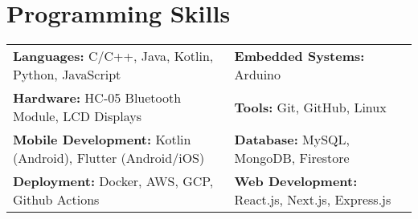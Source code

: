 \documentclass[letterpaper,10pt]{article}
\newcommand{\customFormat}[2]{\textbf{#1:} #2}
\begin{document}
{\section{Programming Skills}
\begin{tabular}{ll}
\customFormat{Languages}{C/C++, Java, Kotlin, Python, JavaScript} & \customFormat{Embedded Systems}{Arduino} \\
\customFormat{Hardware}{HC-05 Bluetooth Module, LCD Displays} & \customFormat{Tools}{Git, GitHub, Linux} \\
\customFormat{Mobile Development}{Kotlin (Android), Flutter (Android/iOS)} & \customFormat{Database}{MySQL, MongoDB, Firestore} \\
\customFormat{Deployment}{Docker, AWS, GCP, Github Actions} & \customFormat{Web Development}{React.js, Next.js, Express.js} \\
\end{tabular}
}
\end{document}
